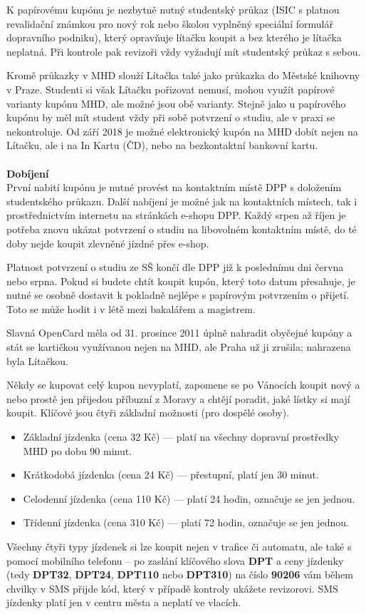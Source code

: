 K papírovému kupónu je nezbytně nutný studentský průkaz (ISIC s platnou
revalidační známkou pro nový rok nebo školou vyplněný speciální formulář
dopravního podniku), který opravňuje lítačku koupit a bez kterého je lítačka
neplatná. Při kontrole pak revizoři vždy vyžadují mít studentský průkaz s sebou.

Kromě průkazky v MHD slouží Lítačka také jako průkazka do Městské knihovny v
Praze. Studenti si však Lítačku pořizovat nemusí, mohou využít papírové varianty
kupónu MHD, ale možné jsou obě varianty. Stejně jako u papírového kupónu by měl
mít student vždy při sobě potvrzení o studiu, ale v praxi se nekontroluje. Od
září 2018 je možné elektronický kupón na MHD dobít nejen na Lítačku, ale i na In
Kartu (ČD), nebo na bezkontaktní bankovní kartu.
\\\\
\textbf{Dobíjení}
\\
První nabití kupónu je nutné provést na kontaktním místě DPP s doložením
studentského průkazu. Další nabíjení je možné jak na kontaktních místech, tak i
prostřednictvím internetu na stránkách e-shopu DPP. Každý srpen až říjen je
potřeba znovu ukázat potvrzení o studiu na libovolném kontaktním místě, do té
doby nejde koupit zlevněné jízdné přes e-shop.

Platnost potvrzení o studiu ze SŠ končí dle DPP již k poslednímu dni června nebo
srpna. Pokud si budete chtít koupit kupón, který toto datum přesahuje, je nutné
se osobně dostavit k pokladně nejlépe s papírovým potvrzením o přijetí. Toto se
může hodit i v létě mezi bakalářem a magistrem.

Slavná OpenCard měla od 31. prosince 2011 úplně nahradit obyčejné kupóny a stát
se kartičkou využívanou nejen na MHD, ale Praha už ji zrušila; nahrazena byla
Lítačkou.

Někdy se kupovat celý kupon nevyplatí, zapomene se po Vánocích koupit nový a
nebo prostě jen přijedou příbuzní z Moravy a chtějí poradit, jaké lístky si mají
koupit. Klíčové jsou čtyři základní možnosti (pro dospělé osoby).
\begin{itemize}
\item Základní jízdenka (cena 32 Kč) --- platí na všechny dopravní prostředky
MHD po dobu 90 minut.
\item Krátkodobá jízdenka (cena 24 Kč) --- přestupní, platí jen 30 minut.
\item Celodenní jízdenka (cena 110 Kč) --- platí 24 hodin, označuje se jen
jednou.
\item Třídenní jízdenka (cena 310 Kč) --- platí 72 hodin, označuje se jen
jednou.
\end{itemize}
Všechny čtyři typy jízdenek si lze koupit nejen v trafice či automatu, ale také
s pomocí mobilního telefonu – po zaslání klíčového slova \textbf{DPT} a ceny
jízdenky (tedy \textbf{DPT32}, \textbf{DPT24}, \textbf{DPT110} nebo
\textbf{DPT310}) na číslo \textbf{90206} vám během chvilky v SMS přijde kód,
který v případě kontroly ukážete revizorovi. SMS jízdenky platí jen v centru
města a neplatí ve vlacích.


